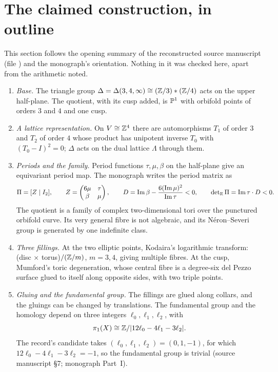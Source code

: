 \section{The claimed construction, in outline}\label{sec:candidate}

This section follows the opening summary of the reconstructed source manuscript (file ) and the monograph's orientation. Nothing in it was checked here, apart from the arithmetic noted.

\begin{enumerate}[label=\arabic*.]
\item \emph{Base.} The triangle group $\Delta=\Delta(3,4,\infty)\cong(\mathbb{Z}/3)*(\mathbb{Z}/4)$ acts on the upper half-plane. The quotient, with its cusp added, is $\mathbb{P}^1$ with orbifold points of orders $3$ and $4$ and one cusp.
\item \emph{A lattice representation.} On $V\cong\mathbb{Z}^4$ there are automorphisms $T_1$ of order $3$ and $T_2$ of order $4$ whose product has unipotent inverse $T_0$ with $(T_0-I)^2=0$; $\Delta$ acts on the dual lattice $\Lambda$ through them.
\item \emph{Periods and the family.} Period functions $\tau,\mu,\beta$ on the half-plane give an equivariant period map. The monograph writes the period matrix as
\[
\Pi=[Z\mid I_2],\qquad Z=\begin{pmatrix}6\mu&\tau\\ \beta&\mu\end{pmatrix},\qquad D=\operatorname{Im}\beta-\frac{6(\operatorname{Im}\mu)^2}{\operatorname{Im}\tau}<0,\qquad \det\nolimits_{\mathbb{R}}\Pi=\operatorname{Im}\tau\cdot D<0 .
\]
The quotient is a family of complex two-dimensional tori over the punctured orbifold curve. Its very general fibre is not algebraic, and its Néron--Severi group is generated by one indefinite class.
\item \emph{Three fillings.} At the two elliptic points, Kodaira's logarithmic transform: (disc $\times$ torus)$/(\mathbb{Z}/m)$, $m=3,4$, giving multiple fibres. At the cusp, Mumford's toric degeneration, whose central fibre is a degree-six del Pezzo surface glued to itself along opposite sides, with two triple points.
\item \emph{Gluing and the fundamental group.} The fillings are glued along collars, and the gluings can be changed by translations. The fundamental group and the homology depend on three integers $\ell_0,\ell_1,\ell_2$, with
\[
\pi_1(X)\cong\mathbb{Z}/|12\ell_0-4\ell_1-3\ell_2| .
\]
The record's candidate takes $(\ell_0,\ell_1,\ell_2)=(0,1,-1)$, for which $12\ell_0-4\ell_1-3\ell_2=-1$, so the fundamental group is trivial (source manuscript §7; monograph Part~I).

\end{enumerate}
